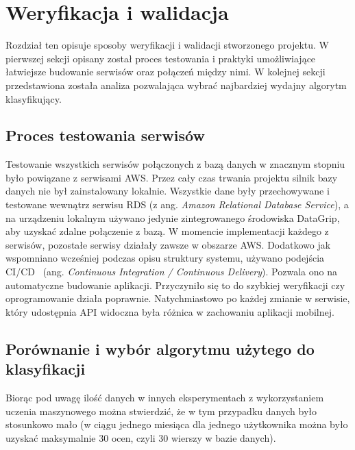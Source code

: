 \documentclass[a4paper,twoside,12pt]{book}
\newcommand{\obcy}[1]{\emph{#1}}
\newcommand{\ang}[1]{{\selectlanguage{british}\obcy{#1}}}
\begin{document}
\chapter{Weryfikacja i walidacja}
\label{chap:valid}
Rozdział ten opisuje sposoby weryfikacji i walidacji stworzonego projektu. W pierwszej sekcji opisany został proces testowania i praktyki umożliwiające łatwiejsze budowanie serwisów oraz połączeń między nimi. W kolejnej sekcji przedstawiona została analiza pozwalająca wybrać najbardziej wydajny algorytm klasyfikujący.

\section{Proces testowania serwisów}
Testowanie wszystkich serwisów połączonych z bazą danych w znacznym stopniu było powiązane z serwisami AWS. Przez cały czas trwania projektu silnik bazy danych nie był zainstalowany lokalnie. Wszystkie dane były przechowywane i testowane wewnątrz serwisu RDS (z ang. \ang{Amazon Relational Database Service}), a na urządzeniu lokalnym używano jedynie zintegrowanego środowiska DataGrip, aby uzyskać zdalne połączenie z bazą. W momencie implementacji każdego z serwisów, pozostałe serwisy działały zawsze w obszarze AWS. Dodatkowo jak wspomniano wcześniej podczas opisu struktury systemu, używano podejścia CI/CD~\cite{cicd} (ang. \ang{Continuous Integration / Continuous Delivery}). Pozwala ono na automatyczne budowanie aplikacji. Przyczyniło się to do szybkiej weryfikacji czy oprogramowanie działa poprawnie. Natychmiastowo po każdej zmianie w serwisie, który udostępnia API widoczna była różnica w zachowaniu aplikacji mobilnej. 

\section{Porównanie i wybór algorytmu użytego do klasyfikacji}
Biorąc pod uwagę ilość danych w innych eksperymentach z wykorzystaniem uczenia maszynowego można stwierdzić, że w tym przypadku danych było stosunkowo mało (w ciągu jednego miesiąca dla jednego użytkownika można było uzyskać maksymalnie 30 ocen, czyli 30 wierszy w bazie danych). 
\end{document}
